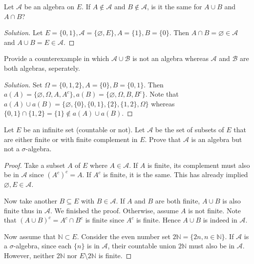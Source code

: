 \documentclass[11pt,singlecolumn, openany, citestyle=authoryear]{elegantbook}
\begin{document}
\begin{CJK}{UTF8}{gbsn}
\begin{exercise}
    Let $\mathcal{A}$ be an algebra on $E$. If $A \notin \mathcal{A}$
    and $B \notin \mathcal{A}$, is it the same for $A \cup B$ and $A \cap B$?
\end{exercise}
\begin{proof}[Solution]
    Let $E=\{0,1\}, \mathcal{A}=\{\varnothing, E\}, A=\{1\}, B = \{0\}$.
    Then $A \cap B = \varnothing \in \mathcal{A}$ and $A \cup B = E \in \mathcal{A}$.
\end{proof}

\begin{exercise}
    Provide a counterexample in which $\mathcal{A} \cup \mathcal{B}$ is not an algebra 
    whereas $\mathcal{A}$ and $\mathcal{B}$ are both algebras, seperately. 
\end{exercise}
\begin{proof}[Solution]
    Set $\Omega = \{0,1,2\}, A = \{0\}, B = \{0,1\}$. Then $a(A)=\{\varnothing,\Omega,
    A,A^c\},a(B)=\{\varnothing,\Omega,B,B^c\}$. Note that 
    $a(A)\cup a(B)=\{\varnothing,\{0\}, \{0,1\},\{2\},\{1,2\},\Omega\}$ whereas 
    $\{0,1\}\cap \{1,2\}=\{1\}\notin a(A)\cup a(B)$.
\end{proof}

\begin{exercise}
    Let $E$ be an infinite set (countable or not). Let $\mathcal{A}$ be the set of
    subsets of $E$ that are either finite or with finite complement in $E$. Prove that 
    $\mathcal{A}$ is an algebra but not a $\sigma$-algebra. 
\end{exercise}
\begin{proof}
    Take a subset $A$ of $E$ where $A \in \mathcal{A}$. If $A$ is finite, its complement 
    must also be in $\mathcal{A}$ since $(A^c)^c=A$. If $A^c$ is finite, it is the same.
    This has already implied $\varnothing,E \in \mathcal{A}$.
    
    Now take another $B \subseteq E$ with $B \in \mathcal{A}$. 
    If $A$ and $B$ are both finite, $A \cup B$ is also finite thus in $\mathcal{A}$. We 
    finished the proof. Otherwise, assume $A$ is not finite. Note that 
    $(A \cup B)^c = A^c \cap B^c$ is finite since $A^c$ is finite. Hence $A \cup B$ is indeed
    in $\mathcal{A}$.

    Now assume that $\mathbb{N}\subset E$. Consider the even number set 
    $2\mathbb{N}=\{2n,n\in\mathbb{N}\}$. If $\mathcal{A}$ is a $\sigma$-algebra,
    since each $\{n\}$ is in $\mathcal{A}$, their countable union $2\mathbb{N}$ must also 
    be in $\mathcal{A}$. However, neither $2\mathbb{N}$ nor $E\setminus 2\mathbb{N}$ is finite.
\end{proof}


\end{CJK}
\end{document}
